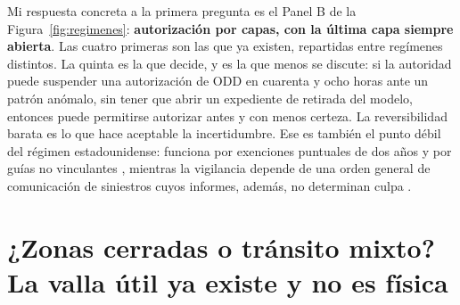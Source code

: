 \documentclass[11pt,letterpaper]{article}
\begin{document}
Mi respuesta concreta a la primera pregunta es el Panel B de la
Figura~\ref{fig:regimenes}: \textbf{autorización por capas, con la última capa
siempre abierta}. Las cuatro primeras son las que ya existen, repartidas entre
regímenes distintos. La quinta es la que decide, y es la que menos se discute: si
la autoridad puede suspender una autorización de ODD en cuarenta y ocho horas
ante un patrón anómalo, sin tener que abrir un expediente de retirada del modelo,
entonces puede permitirse autorizar antes y con menos certeza. La reversibilidad
barata es lo que hace aceptable la incertidumbre. Ese es también el punto débil
del régimen estadounidense: funciona por exenciones puntuales de dos años
\parencite{fr2026zoox} y por guías no vinculantes \parencite{fr2026guia},
mientras la vigilancia depende de una orden general de comunicación de siniestros
cuyos informes, además, no determinan culpa \parencite{nhtsasgo2026}.

\section{¿Zonas cerradas o tránsito mixto? La valla útil ya existe y no es
física}
\end{document}
